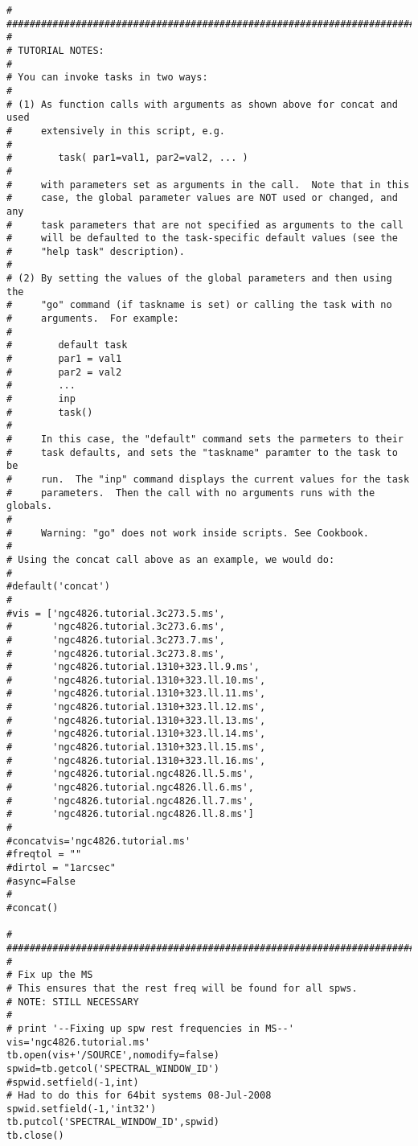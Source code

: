 \begin{verbatim}
#
##########################################################################
#
# TUTORIAL NOTES:
#
# You can invoke tasks in two ways:
#
# (1) As function calls with arguments as shown above for concat and used
#     extensively in this script, e.g.
#
#        task( par1=val1, par2=val2, ... )
#
#     with parameters set as arguments in the call.  Note that in this
#     case, the global parameter values are NOT used or changed, and any
#     task parameters that are not specified as arguments to the call
#     will be defaulted to the task-specific default values (see the
#     "help task" description).
#
# (2) By setting the values of the global parameters and then using the
#     "go" command (if taskname is set) or calling the task with no
#     arguments.  For example:
#
#        default task
#        par1 = val1
#        par2 = val2
#        ...
#        inp
#        task()
#
#     In this case, the "default" command sets the parmeters to their
#     task defaults, and sets the "taskname" paramter to the task to be
#     run.  The "inp" command displays the current values for the task
#     parameters.  Then the call with no arguments runs with the globals.
#
#     Warning: "go" does not work inside scripts. See Cookbook.
#
# Using the concat call above as an example, we would do:
#
#default('concat')
#
#vis = ['ngc4826.tutorial.3c273.5.ms',
#       'ngc4826.tutorial.3c273.6.ms',
#       'ngc4826.tutorial.3c273.7.ms',
#       'ngc4826.tutorial.3c273.8.ms',
#       'ngc4826.tutorial.1310+323.ll.9.ms',
#       'ngc4826.tutorial.1310+323.ll.10.ms',
#       'ngc4826.tutorial.1310+323.ll.11.ms',
#       'ngc4826.tutorial.1310+323.ll.12.ms',
#       'ngc4826.tutorial.1310+323.ll.13.ms',
#       'ngc4826.tutorial.1310+323.ll.14.ms',
#       'ngc4826.tutorial.1310+323.ll.15.ms',
#       'ngc4826.tutorial.1310+323.ll.16.ms',       
#       'ngc4826.tutorial.ngc4826.ll.5.ms',
#       'ngc4826.tutorial.ngc4826.ll.6.ms',
#       'ngc4826.tutorial.ngc4826.ll.7.ms',
#       'ngc4826.tutorial.ngc4826.ll.8.ms']
#
#concatvis='ngc4826.tutorial.ms'
#freqtol = ""
#dirtol = "1arcsec"
#async=False
#
#concat()

#
##########################################################################
#
# Fix up the MS
# This ensures that the rest freq will be found for all spws. 
# NOTE: STILL NECESSARY
#
# print '--Fixing up spw rest frequencies in MS--'
vis='ngc4826.tutorial.ms'
tb.open(vis+'/SOURCE',nomodify=false)
spwid=tb.getcol('SPECTRAL_WINDOW_ID')
#spwid.setfield(-1,int)
# Had to do this for 64bit systems 08-Jul-2008
spwid.setfield(-1,'int32')
tb.putcol('SPECTRAL_WINDOW_ID',spwid)
tb.close()


\end{verbatim}
